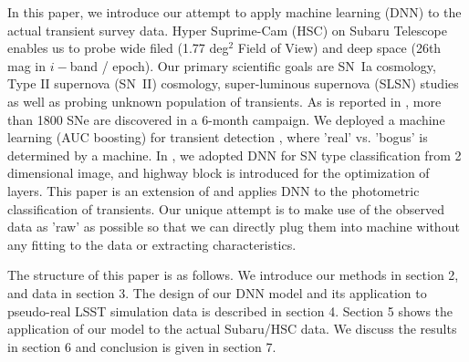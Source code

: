 \documentclass[useamsfonts]{pasj01}
\begin{document}
In this paper, we introduce our attempt to apply machine learning (DNN) to the actual transient survey data.
Hyper Suprime-Cam (HSC) \citep{miyazaki18a,Komiyama2018,kawanomoto18a,Furusawa2018} on Subaru Telescope enables us to probe wide filed (1.77 deg$^2$ Field of View) and deep space (26th mag in $i-$band / epoch).  Our primary scientific goals are SN~Ia cosmology, Type II supernova (SN~II) cosmology, super-luminous supernova (SLSN) studies as well as probing unknown population of transients.  
As is reported in \citet{yasuda19a}, more than 1800 SNe are discovered in a 6-month campaign. 
We deployed a machine learning (AUC boosting) for transient detection \citep{morii16a}, where 'real' vs. 'bogus' is determined by a machine.
In \citet{kimura17a}, we adopted DNN for SN type classification from 2 dimensional image, and highway block is introduced for the optimization of layers.
This paper is an extension of \citet{kimura17a} and applies DNN to the photometric classification of transients.   
Our unique attempt is to make use of the observed data as 'raw' as possible so that we can directly plug them into machine without any fitting to the data or extracting characteristics.

The structure of this paper is as follows. We introduce our methods in section 2, and data in section 3. The design of our DNN model and its application to pseudo-real LSST simulation data is described in section 4. Section 5 shows the application of our model to the actual Subaru/HSC data. We discuss the results in section 6 and conclusion is given in section 7.
 
\end{document}
